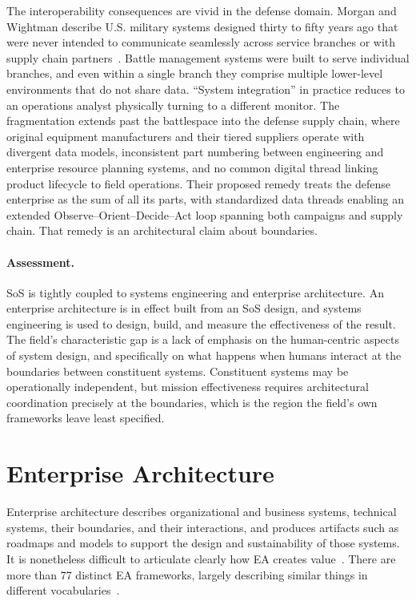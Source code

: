 \documentclass{csimq}
\begin{document}
The interoperability consequences are vivid in the defense domain. Morgan and
Wightman describe U.S. military systems designed thirty to fifty years ago that
were never intended to communicate seamlessly across service branches or with
supply chain partners~\cite{morgan2023}. Battle management systems were built
to serve individual branches, and even within a single branch they comprise
multiple lower-level environments that do not share data. ``System integration''
in practice reduces to an operations analyst physically turning to a different
monitor. The fragmentation extends past the battlespace into the defense supply
chain, where original equipment manufacturers and their tiered suppliers operate
with divergent data models, inconsistent part numbering between engineering and
enterprise resource planning systems, and no common digital thread linking
product lifecycle to field operations. Their proposed remedy treats the
defense enterprise as the sum of all its parts, with standardized data threads
enabling an extended Observe--Orient--Decide--Act loop spanning both campaigns
and supply chain. That remedy is an architectural claim about boundaries.

\paragraph{Assessment.} SoS is tightly coupled to systems engineering and
enterprise architecture. An enterprise architecture is in effect built from an
SoS design, and systems engineering is used to design, build, and measure the
effectiveness of the result. The field's characteristic gap is a lack of
emphasis on the human-centric aspects of system design, and specifically on what
happens when humans interact at the boundaries between constituent systems.
Constituent systems may be operationally independent, but mission effectiveness
requires architectural coordination precisely at the boundaries, which is the
region the field's own frameworks leave least specified.

\section{Enterprise Architecture}
\label{sec:ea}

Enterprise architecture describes organizational and business systems, technical
systems, their boundaries, and their interactions, and produces artifacts such
as roadmaps and models to support the design and sustainability of those
systems. It is nonetheless difficult to articulate clearly how EA creates
value~\cite{gong2019,saintlouis2017}. There are more than 77 distinct EA
frameworks, largely describing similar things in different
vocabularies~\cite{bente2012}.
\end{document}
